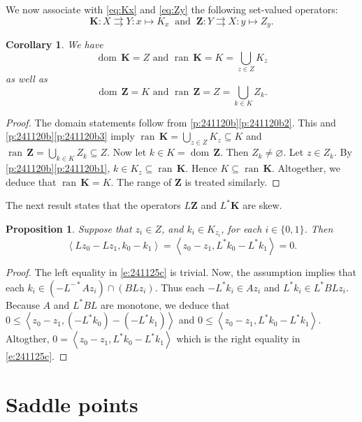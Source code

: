 \documentclass{article}
\newcommand{\To}{\ensuremath{\rightrightarrows}}
\newcommand{\pair}[2]{\left\langle{{#1},{#2}}\right\rangle}
\newcommand{\scal}[2]{\left\langle{#1},{#2}  \right\rangle}
\newcommand{\dom}{\ensuremath{\operatorname{dom}}\,}
\newcommand{\ran}{\ensuremath{{\operatorname{ran}}\,}}
\newcommand{\bK}{\ensuremath{{\mathbf{K}}}}
\newcommand{\bZ}{\ensuremath{{\mathbf{Z}}}}
\newtheorem{corollary}[theorem]{Corollary}
\newtheorem{proposition}[theorem]{Proposition}
\begin{document}
We now associate with \cref{eq:Kx} and \cref{eq:Zy} the following 
set-valued operators:
\begin{equation}
\bK\colon X\To Y\colon x\mapsto K_x
\;\;\text{and}\;\;
\bZ\colon Y\To X\colon y\mapsto Z_y.
\end{equation}


\begin{corollary}
\label{c:241120c}
We have 
\begin{equation}
\text{$\dom \bK = Z$ and $\ran \bK = K = \bigcup_{z\in Z}K_z$}
\end{equation}
as well as 
\begin{equation}
\text{
$\dom \bZ = K$ and $\ran \bZ = Z = \bigcup_{k\in K}Z_k$.
}
\end{equation}
\end{corollary}
\begin{proof}
The domain statements follow from \cref{p:241120b}\cref{p:241120b2}.
This and \cref{p:241120b}\cref{p:241120b3} 
imply $\ran\bK = \bigcup_{z\in Z}K_z\subseteq K$
and $\ran\bZ = \bigcup_{k\in K}Z_k\subseteq Z$. 
Now let $k\in K= \dom \bZ$. 
Then $Z_k\neq\varnothing$. 
Let $z\in Z_k$. 
By \cref{p:241120b}\cref{p:241120b1}, 
$k \in K_z \subseteq \ran \bK$.
Hence 
$K\subseteq\ran \bK$. 
Altogether, we deduce that 
$\ran \bK = K$. The range of $\bZ$ is treated similarly. 
\end{proof}

The next result states that the operators $L\bZ$ and $L^*\bK$ are skew. 

\begin{proposition}\label{p:241120a}
Suppose that $z_i\in Z$, and $k_i\in K_{z_i}$, for each $i\in\{0,1\}$. 
Then 
\begin{equation}
\label{e:241125c}
\pair{Lz_0-Lz_1}{k_0-k_1}
= \pair{z_0-z_1}{L^*k_0-L^*k_1}=0.
\end{equation}
\end{proposition}
\begin{proof}
The left equality in \cref{e:241125c} is trivial. 
Now, the assumption implies that each $k_i \in (-L^{-*}Az_i)\cap (BLz_i)$.
Thus each $-L^*k_i \in Az_i$ and $L^*k_i\in L^*BLz_i$.
Because $A$ and $L^*BL$ are monotone, we deduce that 
$0 \leq \scal{z_0-z_1}{(-L^*k_0)-(-L^*k_1)}$ 
and $0 \leq \scal{z_0-z_1}{L^*k_0-L^*k_1}$.
Altogther, 
$0=\scal{z_0-z_1}{L^*k_0-L^*k_1}$ which is the right equality in
\cref{e:241125c}.
\end{proof}


\section{Saddle points}
\end{document}
